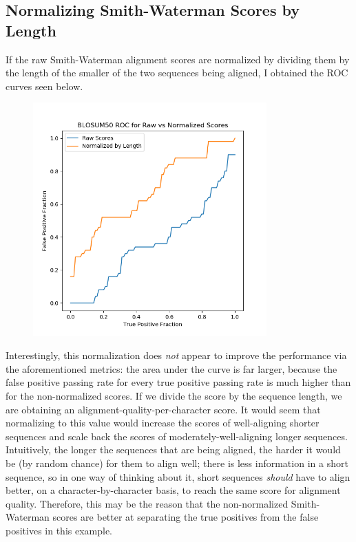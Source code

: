 \documentclass{article}
\begin{document}
\subsection{Normalizing Smith-Waterman Scores by Length}
If the raw Smith-Waterman alignment scores are normalized by dividing them by the length of the smaller of the two sequences being aligned, I obtained the ROC curves seen below.
\begin{figure}[h!]
\centering
\includegraphics[width=0.8\textwidth]{ROC_Normalized.png}
\end{figure}
\par Interestingly, this normalization does {\it not} appear to improve the performance via the aforementioned metrics: the area under the curve is far larger, because the false positive passing rate for every true positive passing rate is much higher than for the non-normalized scores. If we divide the score by the sequence length, we are obtaining an alignment-quality-per-character score. It would seem that normalizing to this value would increase the scores of well-aligning shorter sequences and scale back the scores of moderately-well-aligning longer sequences. Intuitively, the longer the sequences that are being aligned, the harder it would be (by random chance) for them to align well; there is less information in a short sequence, so in one way of thinking about it, short sequences {\it should} have to align better, on a character-by-character basis, to reach the same score for alignment quality. Therefore, this may be the reason that the non-normalized Smith-Waterman scores are better at separating the true positives from the false positives in this example.
\end{document}

